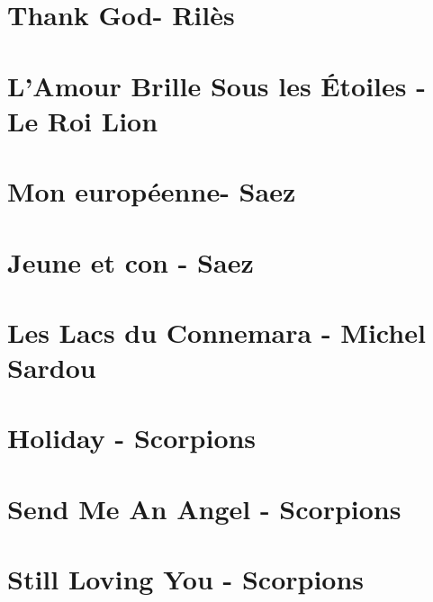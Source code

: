 \documentclass[11pt]{article}
\begin{document}
\section{Thank God- Rilès}
\begin{guitar}

\end{guitar}

\section{L'Amour Brille Sous les Étoiles - Le Roi Lion}


\section{Mon européenne- Saez}
\begin{guitar}

\end{guitar}


\section{Jeune et con - Saez}
\begin{guitar}

\end{guitar}

\section{Les Lacs du Connemara - Michel Sardou}
\begin{guitar}

\end{guitar}

\section*{Holiday - Scorpions}
\begin{guitar}

\end{guitar}

\section{Send Me An Angel - Scorpions}
\begin{guitar}

\end{guitar}


\section{Still Loving You - Scorpions}
\begin{guitar}

\end{guitar}
\end{document}
